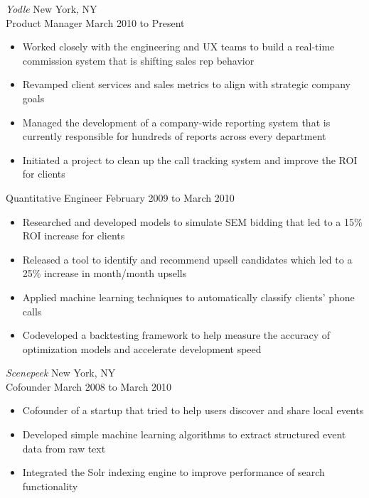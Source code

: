 \documentclass{res}
\begin{document}
\begin{resume}
{\sl Yodle} \hfill New York, NY \\
Product Manager \hfill   March 2010 to Present
   \begin{itemize} \itemsep -2pt %
   \item Worked closely with the engineering and UX teams to build a real-time commission system that is shifting sales rep behavior
   \item Revamped client services and sales metrics to align with strategic company goals
   \item Managed the development of a company-wide reporting system that is currently responsible for hundreds of reports across every department
   \item Initiated a project to clean up the call tracking system and improve the ROI for clients
 \end{itemize} \vspace{-12pt}
Quantitative Engineer \hfill   February 2009 to March 2010
   \begin{itemize} \itemsep -2pt %
   \item Researched and developed models to simulate SEM bidding that led to a 15\% ROI increase for clients
   \item Released a tool to identify and recommend upsell candidates which led to a 25\% increase in month/month upsells
   \item Applied machine learning techniques to automatically classify clients' phone calls
   \item Codeveloped a backtesting framework to help measure the accuracy of optimization models and accelerate development speed
 \end{itemize} %

{\sl Scenepeek} \hfill New York, NY \\
Cofounder \hfill   March 2008 to March 2010
   \begin{itemize} \itemsep -2pt %
   \item Cofounder of a startup that tried to help users discover and share local events
   \item Developed simple machine learning algorithms to extract structured event data from raw text
   \item Integrated the Solr indexing engine to improve performance of search functionality
 \end{itemize} %


\end{resume}
\end{document}
